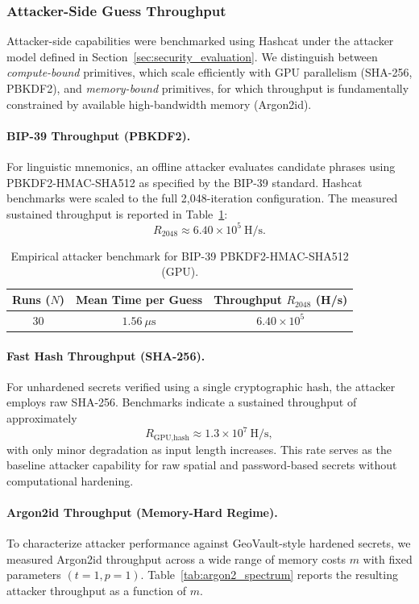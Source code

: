 \documentclass[journal,article,submit,pdftex,moreauthors]{Definitions/mdpi}
\begin{document}
\subsubsection{Attacker-Side Guess Throughput}
\label{sec:attacker_performance}

Attacker-side capabilities were benchmarked using Hashcat under the attacker model defined in Section~\ref{sec:security_evaluation}. We distinguish between \emph{compute-bound} primitives, which scale efficiently with GPU parallelism (SHA-256, PBKDF2), and \emph{memory-bound} primitives, for which throughput is fundamentally constrained by available high-bandwidth memory (Argon2id).

\paragraph{BIP-39 Throughput (PBKDF2).}
For linguistic mnemonics, an offline attacker evaluates candidate phrases using PBKDF2-HMAC-SHA512 as specified by the BIP-39 standard. Hashcat benchmarks were scaled to the full 2{,}048-iteration configuration. The measured sustained throughput is reported in Table~\ref{tab:attacker_cost}:
\[
R_{2048} \approx 6.40 \times 10^{5} \ \text{H/s}.
\]

\begin{table}[H]
\caption{Empirical attacker benchmark for BIP-39 PBKDF2-HMAC-SHA512 (GPU).}
\label{tab:attacker_cost}
\centering
\begin{tabular}{ccc}
\toprule
\textbf{Runs ($N$)} & \textbf{Mean Time per Guess} & \textbf{Throughput $R_{2048}$ (H/s)} \\
\midrule
30 & $1.56~\mu\mathrm{s}$ & $6.40 \times 10^{5}$ \\
\bottomrule
\end{tabular}
\end{table}

\paragraph{Fast Hash Throughput (SHA-256).}
For unhardened secrets verified using a single cryptographic hash, the attacker employs raw SHA-256. Benchmarks indicate a sustained throughput of approximately
\[
R_{\text{GPU,hash}} \approx 1.3 \times 10^{7} \ \text{H/s},
\]
with only minor degradation as input length increases. This rate serves as the baseline attacker capability for raw spatial and password-based secrets without computational hardening.

\paragraph{Argon2id Throughput (Memory-Hard Regime).}
To characterize attacker performance against GeoVault-style hardened secrets, we measured Argon2id throughput across a wide range of memory costs $m$ with fixed parameters $(t=1, p=1)$. Table~\ref{tab:argon2_spectrum} reports the resulting attacker throughput as a function of $m$.
\end{document}
